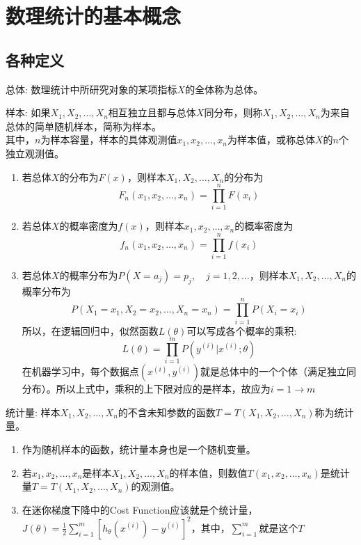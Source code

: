 \section{数理统计的基本概念}
\subsection{各种定义}
\begin{defination}
	总体: 数理统计中所研究对象的某项指标$X$的全体称为总体。
\end{defination}
\begin{defination}
	样本: 如果$X_1, X_2, \dots, X_n$相互独立且都与总体$X$同分布，则称$X_1, X_2, \dots, X_n$为来自总体的简单随机样本，简称为样本。\\
	其中，$n$为样本容量，样本的具体观测值$x_1, x_2, \dots, x_n$为样本值，或称总体$X$的$n$个独立观测值。
\end{defination}
\begin{enumerate}
	\item 若总体$X$的分布为$F(x)$，则样本$X_1, X_2, \dots, X_n$的分布为
	\begin{equation}
		F_n(x_1, x_2, \dots, x_n) = \prod_{i=1}^{n}F(x_i)
	\end{equation}

	\item 若总体$X$的概率密度为$f(x)$，则样本$x_1, x_2, \dots, x_n$的概率密度为
	\begin{equation}
		f_n(x_1, x_2, \dots, x_n) = \prod_{i=1}^{n}f(x_i)
	\end{equation}
	\item 若总体$X$的概率分布为$P(X=a_j)=p_j, \quad j = 1,2, \dots$，则样本$X_1, X_2, \dots, X_n$的概率分布为
	\begin{equation}
		P(X_1=x_1, X_2=x_2, \dots, X_n=x_n) = \prod_{i=1}^{n}P(X_i = x_i)
	\end{equation}
	所以，在逻辑回归中，似然函数$L(\theta)$可以写成各个概率的乘积:
	\begin{equation}
		L(\theta)=\prod_{i=1}^{m}P(y^{(i)}|x^{(i)}; \theta)
	\end{equation}
	在机器学习中，每个数据点$(x^{(i)},y^{(i)})$就是总体中的一个个体（满足独立同分布）。所以上式中，乘积的上下限对应的是样本，故应为$i=1 \to m$
\end{enumerate}

\begin{defination}
	统计量: 样本$X_1, X_2, \dots, X_n$的不含未知参数的函数$T = T(X_1, X_2, \dots, X_n)$称为统计量。
\end{defination}
\begin{enumerate}
	\item 作为随机样本的函数，统计量本身也是一个随机变量。
	\item 若$x_1, x_2, \dots, x_n$是样本$X_1, X_2, \dots, X_n$的样本值，则数值$T(x_1, x_2, \dots, x_n)$是统计量$T = T(X_1, X_2, \dots, X_n)$的观测值。
	\item 在迷你梯度下降中的Cost Function应该就是个统计量，$J(\theta)=\frac{1}{2}\sum_{i=1}^{m}\left[h_\theta(x^{(i)}) - y^{(i)}\right]^2$，其中，$\sum_{i=1}^{m}$就是这个$T${\color{red}{（正确性待查）}}
\end{enumerate}

